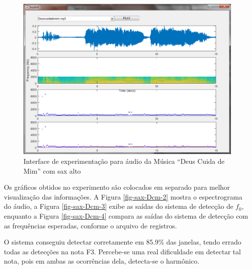 \begin{figure}
	\centering
	\includegraphics[width=0.75\linewidth]{pasta1_figuras/sax-Dcm.png}
	\caption{Interface de experimentação para áudio da Música ``Deus Cuida de Mim'' com sax alto}
	\label{fig-sax-Dcm}
\end{figure}

Os gráficos obtidos no experimento são colocados em separado para melhor visualização das informações. A Figura \ref{fig-sax-Dcm-2} mostra o espectrograma do áudio, a Figura \ref{fig-sax-Dcm-3} exibe as saídas do sistema de detecção de $f_0$, enquanto a Figura \ref{fig-sax-Dcm-4} compara as saídas do sistema de detecção com as frequências esperadas, conforme o arquivo de registros.


O sistema conseguiu detectar corretamente em 85.9\% das janelas, tendo errado todas as detecções na nota F3. Percebe-se uma real dificuldade em detectar tal nota, pois em ambas as ocorrências dela, detecta-se o harmônico.

